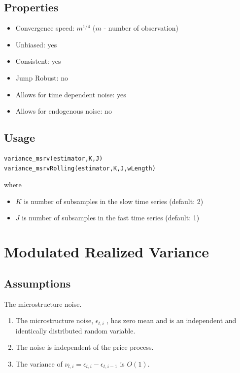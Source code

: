 \documentclass[letterpaper]{report}
\begin{document}
\subsection{Properties}
\begin{itemize}
\item Convergence speed: $m^{1/4}$ ($m$ - number of observation)
\item Unbiased: yes
\item Consistent: yes
\item Jump Robust: no
\item Allows for time dependent noise: yes
\item Allows for endogenous noise: no
\end{itemize} 
 \subsection{Usage}
\begin{lstlisting}
variance_msrv(estimator,K,J)
variance_msrvRolling(estimator,K,J,wLength)
\end{lstlisting}
where

\begin{itemize}
\item $K$ is number of subsamples in the slow time series (default: 2)
\item $J$ is number of subsamples in the fast time series (default: 1)
\end{itemize}

\thispagestyle{plain}
 
\section{Modulated Realized Variance}
\subsection{Assumptions}
The microstructure noise.
\begin{enumerate}
\item The microstructure noise, $\epsilon_{t,i}$ , has zero mean and is an
independent and identically distributed random variable.
\item The noise is independent of the price process.
\item The variance of $\nu_{t,i} = \epsilon_{t,i} - \epsilon_{t,i-1}$ is
$O(1)$.
\end{enumerate}
\end{document}
